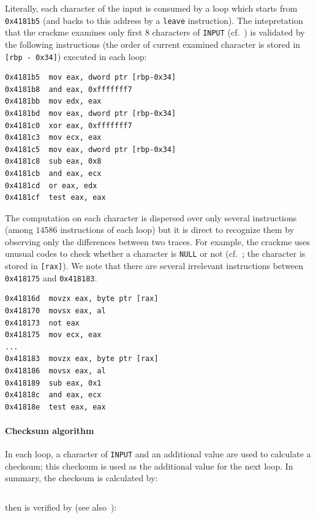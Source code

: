 \documentclass{easychair}
\begin{document}
Literally, each character of the input is consumed by a loop which starts from \texttt{0x4181b5} (and backs to this address by a \texttt{leave} instruction). The intepretation that the crackme examines only first $8$ characters of \texttt{INPUT} (cf.~) is validated by the following instructions (the order of current examined character is stored in \texttt{[rbp - 0x34]}) executed in each loop:
\begin{lstlisting}[frame=lines, caption={Checking if length is $8$}, captionpos=b, boxpos=b, language={[x86masm]Assembler}, label=lst:checklength]
0x4181b5  mov eax, dword ptr [rbp-0x34]
0x4181b8  and eax, 0xfffffff7
0x4181bb  mov edx, eax
0x4181bd  mov eax, dword ptr [rbp-0x34]
0x4181c0  xor eax, 0xfffffff7
0x4181c3  mov ecx, eax
0x4181c5  mov eax, dword ptr [rbp-0x34]
0x4181c8  sub eax, 0x8
0x4181cb  and eax, ecx
0x4181cd  or eax, edx
0x4181cf  test eax, eax
\end{lstlisting}
The computation on each character is dispersed over only several instructions (among $14586$ instructions of each loop) but it is direct to recognize them by observing only the differences between two traces. For example, the crackme uses unusual codes to check whether a character is \texttt{NULL} or not (cf.~; the character is stored in \texttt{[rax]}). We note that there are several irrelevant instructions between \texttt{0x418175} and \texttt{0x418183}.
\begin{lstlisting}[frame=lines, caption={Checking if character is \texttt{NULL}}, captionpos=b, boxpos=b, language={[x86masm]Assembler}, label=lst:checknull]
0x41816d  movzx eax, byte ptr [rax]
0x418170  movsx eax, al
0x418173  not eax
0x418175  mov ecx, eax
...
0x418183  movzx eax, byte ptr [rax]
0x418186  movsx eax, al
0x418189  sub eax, 0x1
0x41818c  and eax, ecx
0x41818e  test eax, eax
\end{lstlisting}

\paragraph{Checksum algorithm}
In each loop, a character of \texttt{INPUT} and an additional value are used to calculate a checksum; this checksum is used as the additional value for the next loop. In summary, the checksum is calculated by:
\begin{lstlisting}[frame=lines, caption={Calculating checksum}, captionpos=b, boxpos=b, language={[x86masm]Assembler}, label=lst:checksumcalculation]
\end{lstlisting}
then is verified by (see also~):
\begin{lstlisting}[frame=lines, caption={Verifying checksum}, captionpos=b, boxpos=b, language={[x86masm]Assembler}, label=lst:checksumverification]
\end{lstlisting}
\end{document}
